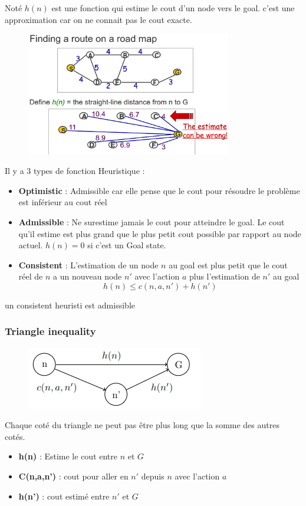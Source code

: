 		Noté $h(n)$ est une fonction qui estime le cout d'un node vers le goal. c'est une approximation car on ne connait pas le cout exacte.
		\begin{figure}[htp]
			\centering
			\includegraphics[width=0.8\textwidth]{img/ExempleHeuristic.png}

		\end{figure}
		
		Il y a 3 types de fonction Heuristique :
		\begin{itemize}
			\item \textbf{Optimistic} : Admissible car elle pense que le cout pour résoudre le problème est inférieur au cout réel
			\item \textbf{Admissible} : Ne surestime jamais le cout pour atteindre le goal. Le cout qu'il estime est plus grand que le plus petit cout possible par rapport au node actuel. $h(n) = 0$ si c'est un Goal state.
			\item \textbf{Consistent} : L'estimation de un node $n$ au goal est plus petit que le cout réel de $n$ a un nouveau node $n'$ avec l'action $a$ plus l'estimation de $n'$ au goal 
			\begin{equation}
				h(n) \leq c(n,a,n') + h(n')
			\end{equation}
		\end{itemize}
		
		un consistent heuristi est admissible
		
		\subsubsection{Triangle inequality}
			\begin{figure}[htp]
				\centering
				\includegraphics[scale=1]{img/Triangle.png}
			\end{figure}
			Chaque coté du triangle ne peut pas être plus long que la somme des autres cotés.
			\begin{itemize}
				\item \textbf{h(n)} : Estime le cout entre $n$ et $G$
				\item \textbf{C(n,a,n')} : cout pour aller en $n'$ depuis $n$ avec l'action $a$
				\item \textbf{h(n')} : cout estimé entre $n'$ et $G$
			\end{itemize}
			
